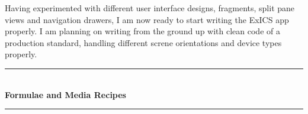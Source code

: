 \documentclass[idxtotoc,hyperref,openany]{labbook} %
\newcommand{\HRule}{\rule{\linewidth}{0.5mm}} %
\begin{document}
Having experimented with different user interface designs, fragments, split pane views and navigation drawers, I am now ready to start writing the ExICS app properly.  I am planning on writing from the ground up with clean code of a production standard, handling different screne orientations and device types properly.




\labday{} %

\begin{center}
\HRule \\[0.4cm]
{\huge \textbf{Formulae and Media Recipes}}\\[0.4cm] %
\HRule \\[1.5cm]
\end{center}


\newpage





\newpage




\end{document}
